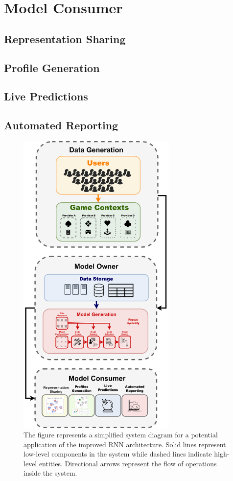 \section{Model Consumer}
\lorem
\subsection{Representation Sharing}
\lorem
\subsection{Profile Generation}
\lorem
\subsection{Live Predictions}
\lorem
\subsection{Automated Reporting}
\lorem

\begin{figure}[ht]
\centering
\includegraphics[width=0.7\textwidth]{images/chapter_5/pipeline_diagram.png}
\caption[\textbf{Model Deployment Pipeline}]{The figure represents a simplified system diagram for a potential application of the improved RNN architecture. Solid lines represent low-level components in the system while dashed lines indicate high-level entities. Directional arrows represent the flow of operations inside the system.}
\label{pipeline}
\end{figure}